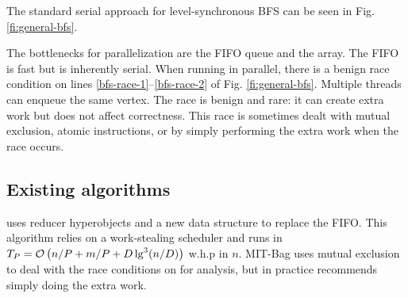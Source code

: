The standard serial approach for level-synchronous BFS can be seen in Fig. \ref{fi:general-bfs}.

The bottlenecks for parallelization are the FIFO queue and the  array.  The FIFO is fast but is inherently serial.  When running in parallel, there is a benign race condition on lines \ref{bfs-race-1}--\ref{bfs-race-2} of Fig. \ref{fi:general-bfs}.  Multiple threads can enqueue the same vertex.  The race is benign and rare: it can create extra work but does not affect correctness.  This race is sometimes dealt with mutual exclusion, atomic instructions, or by simply performing the extra work when the race occurs.

\subsection*{Existing algorithms}
\cite{mit-bag} uses reducer hyperobjects and a new  data structure to replace the FIFO.
This algorithm relies on a work-stealing scheduler and runs in $T_P = {\mathcal O}\left({n/P+m/P+D\lg^3(n/D)}\right)$ w.h.p in $n$.
MIT-Bag uses mutual exclusion to deal with the race conditions on  for analysis, but in practice recommends simply doing the extra work.

